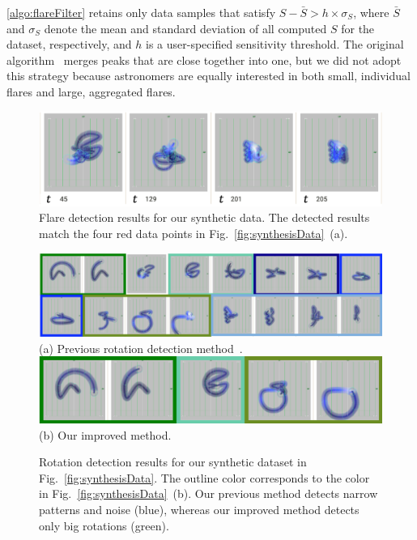 \ref{algo:flareFilter} retains only data samples that satisfy $S - \bar{S} > h \times \sigma_{S}$, 
where $\bar{S}$ and $\sigma_{S}$ denote the mean and standard deviation of all computed $S$ for the dataset, respectively, 
and $h$ is a user-specified sensitivity threshold. 
The original algorithm~\cite{Palshikar2009} merges peaks that are close together into one, 
but we did not adopt this strategy
because astronomers are equally interested in both small, individual flares and large, aggregated flares.

\begin{figure}[tb]
    \centering
    \includegraphics[width=.85\linewidth]{vgtc_journal_latex/figures/flareDetectiondemodataResults.png}
    \caption{Flare detection results for our synthetic data. The detected results match the four red data points in Fig.~\ref{fig:synthesisData}~(a).}
    \label{fig:flareDetection}
\end{figure}
\begin{figure}[tb]
    \centering
    \includegraphics[width=\linewidth]{vgtc_journal_latex/figures/rotationDetectiondemodataResultsOR.png}\\
    \footnotesize{\sf(a) Previous rotation detection method~\cite{Fujishiro2018}.}\\
    \includegraphics[width=.8\linewidth]{vgtc_journal_latex/figures/rotationDetectiondemodataResults.png}\\
    \footnotesize{\sf(b) Our improved method.}
    \caption{Rotation detection results for our synthetic dataset in Fig.~\ref{fig:synthesisData}. 
        The outline color corresponds to the color in Fig.~\ref{fig:synthesisData}~(b).
        Our previous method detects narrow patterns and noise (blue), 
        whereas our improved method detects only big rotations (green).}
    \label{fig:rotationResults}
\end{figure}
